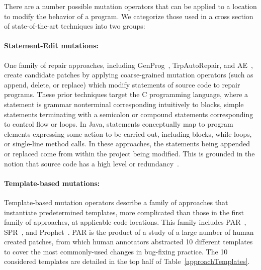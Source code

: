 \documentclass[conference]{IEEEtran}
\begin{document}
There are a number possible mutation operators that can be applied to a location 
to modify the behavior of a program.  We categorize those used in a cross
section of state-of-the-art techniques into two groups: 

\paragraph{Statement-Edit mutations:}
One family of repair approaches, including GenProg~\cite{legoues12}, 
TrpAutoRepair\cite{Qi13TrpAutoR}, and AE~\cite{Weimer13},
create candidate 
patches by applying coarse-grained mutation operators (such as append, delete, or 
replace) which modify statements of source code to 
repair programs. These prior techniques target the C programming language, where
a statement is grammar nonterminal corresponding intuitively to blocks,
simple statements terminating
with a semicolon or compound statements corresponding to control flow or
loops. In Java, statements conceptually map to program elements expressing
some action to be carried out, including blocks,  while loops, or single-line
method calls. In these approaches, the statements being appended or replaced come from within the project being modified. This is grounded in the notion that source code has a high level or redundancy~\cite{gabel10}.

\paragraph{Template-based mutations:}
Template-based mutation operators describe a family of approaches that instantiate
predetermined templates, more complicated than those in the first family of
approaches, at applicable code locations.  This family includes PAR~\cite{kim2013}, 
SPR~\cite{fan15SPR}, and 
Prophet~\cite{long16proph}.
%
PAR is the product of a study of a large number of 
human 
created patches, from which human annotators abstracted 10 different templates to cover
the most commonly-used changes in bug-fixing practice.
The 10 considered templates are detailed in the top half of Table~\ref{approachTemplates}.
\end{document}
